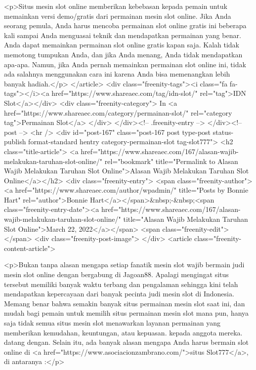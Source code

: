 {<p>Situs mesin slot online memberikan kebebasan kepada pemain untuk memainkan versi demo/gratis dari permainan mesin slot online. Jika Anda seorang pemula, Anda harus mencoba permainan slot online gratis ini beberapa kali sampai Anda menguasai teknik dan mendapatkan permainan yang benar. Anda dapat memainkan permainan slot online gratis kapan saja. Kalah tidak memotong tumpukan Anda, dan jika Anda menang, Anda tidak mendapatkan apa-apa. Namun, jika Anda pernah memainkan permainan slot online ini, tidak ada salahnya menggunakan cara ini karena Anda bisa memenangkan lebih banyak hadiah.</p>
									</article>
																			<div class="freenity-tags"><i class="fa fa-tags"></i><a href="https://www.shareaec.com/tag/idn-slot/" rel="tag">IDN Slot</a></div>
																			<div class="freenity-category">
											In <a href="https://www.shareaec.com/category/permainan-slot/" rel="category tag">Permainan Slot</a>										</div>
																	</div><!-- .freenity-entry -->
							</div><!-- post -->
							<hr />
													<div id="post-167" class="post-167 post type-post status-publish format-standard hentry category-permainan-slot tag-slot777">
								<h2 class="title-article">
									<a href="https://www.shareaec.com/167/alasan-wajib-melakukan-taruhan-slot-online/" rel="bookmark" title="Permalink to Alasan Wajib Melakukan Taruhan Slot Online">Alasan Wajib Melakukan Taruhan Slot Online</a></h2>
								<div class="freenity-entry">
									<span class="freenity-author"><a href="https://www.shareaec.com/author/wpadmin/" title="Posts by Bonnie Hart" rel="author">Bonnie Hart</a></span>&nbsp;-&nbsp;<span class="freenity-entry-date"><a href="https://www.shareaec.com/167/alasan-wajib-melakukan-taruhan-slot-online/" title="Alasan Wajib Melakukan Taruhan Slot Online">March 22, 2022</a></span>
									<span class="freenity-edit"> </span>
									<div class="freenity-post-image">  </div>
																		<article class="freenity-content-article">
										
<p>Bukan tanpa alasan mengapa setiap fanatik mesin slot wajib bermain judi mesin slot online dengan bergabung di Jagoan88. Apalagi mengingat situs tersebut memiliki banyak waktu terbang dan pengalaman sehingga kini telah mendapatkan kepercayaan dari banyak pecinta judi mesin slot di Indonesia. Memang benar bahwa semakin banyak situs permainan mesin slot saat ini, dan mudah bagi pemain untuk memilih situs permainan mesin slot mana pun, hanya saja tidak semua situs mesin slot menawarkan layanan permainan yang memberikan kemudahan, keuntungan, atau kepuasan. kepada anggota mereka. datang dengan. Selain itu, ada banyak alasan mengapa Anda harus bermain slot online di <a href="https://www.asociacionzambrano.com/">situs Slot777</a>, di antaranya :</p>



}
